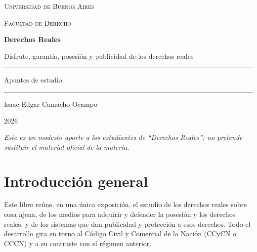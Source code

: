 \documentclass[12pt,oneside]{book}
\newcommand{\universidad}{Universidad de Buenos Aires}
\newcommand{\facultad}{Facultad de Derecho}
\newcommand{\materia}{Derechos Reales}
\newcommand{\autor}{Isaac Edgar Camacho Ocampo}
\newcommand{\anio}{2026}
\begin{document}
\begin{titlepage}
\thispagestyle{empty}
\begin{center}
\vspace*{1cm}
{\large \textsc{\universidad}}

\vspace{0.2cm}
{\large \textsc{\facultad}}

\vspace{3cm}
{\Huge \textbf{\materia}}

\vspace{1cm}
{\LARGE Disfrute, garantía, posesión y publicidad de los derechos reales}

\vspace{1.2cm}
\rule{0.70\textwidth}{0.5pt}

\vspace{0.5cm}
{\large Apuntes de estudio}

\vspace{0.5cm}
\rule{0.70\textwidth}{0.5pt}

\vfill
{\large \autor}

\vspace{0.3cm}
{\large \anio}
\end{center}
\vfill
\begin{flushleft}
\textit{Este es un modesto aporte a los estudiantes de ``Derechos Reales''; no pretende sustituir el material oficial de la materia.}
\end{flushleft}
\end{titlepage}

\tableofcontents

\chapter*{Introducción general}

Este libro reúne, en una única exposición, el estudio de los derechos reales sobre cosa ajena, de los medios para adquirir y defender la posesión y los derechos reales, y de los sistemas que dan publicidad y protección a esos derechos. Todo el desarrollo gira en torno al Código Civil y Comercial de la Nación (CCyCN o CCCN) y a su contraste con el régimen anterior.
\end{document}
